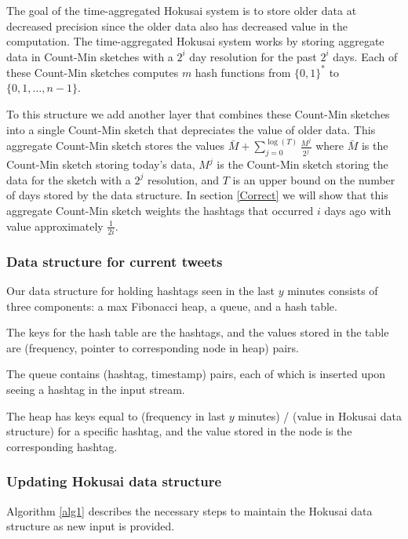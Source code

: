 \documentclass[a4paper,12pt]{article}
\begin{document}
The goal of the time-aggregated Hokusai system is to store older data at decreased precision since the older data also has decreased value in the computation.  The time-aggregated Hokusai system works by storing aggregate data in Count-Min sketches with a $2^i$ day resolution for the past $2^i$ days.  Each of these Count-Min sketches computes $m$ hash functions from $\{0,1\}^*$ to $\{0, 1, …, n-1\}$.

To this structure we add another layer that combines these Count-Min sketches into a single Count-Min sketch that depreciates the value of older data.  This aggregate Count-Min sketch stores the values $\bar{M} + \sum\limits_{j=0}^{\log⁡(T)} \frac{M^j}{2^j}$ where $\bar{M}$ is the Count-Min sketch storing today's data, $M^j$ is the Count-Min sketch storing the data for the sketch with a $2^j$ resolution, and $T$ is an upper bound on the number of days stored by the data structure.  In section \ref{Correct} we will show that this aggregate Count-Min sketch weights the hashtags that occurred $i$ days ago with value approximately $\frac{1}{2i}$.

\subsubsection{Data structure for current tweets}

Our data structure for holding hashtags seen in the last $y$ minutes consists of three components: a max Fibonacci heap, a queue, and a hash table.

The keys for the hash table are the hashtags, and the values stored in the table are (frequency, pointer to corresponding node in heap) pairs.

The queue contains (hashtag, timestamp) pairs, each of which is inserted upon seeing a hashtag in the input stream.

The heap has keys equal to (frequency in last $y$ minutes) / (value in Hokusai data structure) for a specific hashtag, and the value stored in the node is the corresponding hashtag.

\subsubsection{Updating Hokusai data structure\label{Hokusai}}

Algorithm \ref{alg1} describes the necessary steps to maintain the Hokusai data structure as new input is provided.
\end{document}
